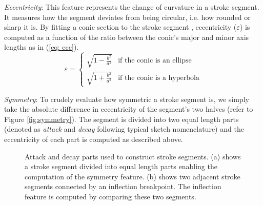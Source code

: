 \noindent \emph{Eccentricity}: This feature represents the change of curvature in a stroke segment. It measures how the segment deviates from being circular, i.e. how rounded or sharp it is. By fitting a conic section to the stroke segment \cite{taubin1991estimation}, eccentricity ($\varepsilon$) is computed as a function of the ratio between the conic's major and minor axis lengths as in (\ref{eq: ecc}).
\vspace{-1mm}
\begin{equation}
\varepsilon=\begin{cases}
\sqrt{1-\frac{b^{2}}{a^{2}}} & \text{if the conic is an ellipse}\\
\sqrt{1+\frac{b^{2}}{a^{2}}} & \text{if the conic is a hyperbola}
\end{cases} \label{eq: ecc}
\end{equation}
\vspace{-3mm}

\noindent \emph{Symmetry}: To crudely evaluate how symmetric a stroke segment is, we simply take the absolute difference in eccentricity of the segment's two halves (refer to Figure \ref{fig:symmetry}). The segment is divided into two equal length parts (denoted as \emph{attack} and \emph{decay} following typical sketch nomenclature) and the eccentricity of each part is computed as described above.
\vspace{-2mm}

\begin{figure}[ht]
\centering
{}
\vspace{-3mm}
\caption{Attack and decay parts used to construct stroke segments. (a) shows a stroke segment divided into equal length parts enabling the computation of the symmetry feature. (b) shows two adjacent stroke segments connected by an inflection breakpoint. The inflection feature is computed by comparing these two segments.}\vspace{-3mm}
\end{figure}

